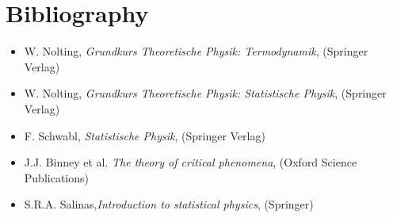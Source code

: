 \chapter{Bibliography}


\begin{itemize}
\item W. Nolting, {\it Grundkurs Theoretische Physik: Termodynamik}, (Springer Verlag)
\item W. Nolting, {\it Grundkurs Theoretische Physik: Statistische Physik}, (Springer Verlag)
\item F. Schwabl, {\it Statistische Physik}, (Springer Verlag)
\item J.J. Binney et al. {\it The theory of critical phenomena}, (Oxford Science Publications)
\item S.R.A. Salinas,{\it Introduction to statistical physics}, (Springer)
\end{itemize}
